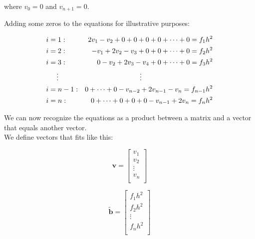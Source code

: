 where $v_0 = 0$ and $v_{n+1} = 0$.

Adding some zeros to the equations for illustrative purposes:

\begin{align*}
&i = 1:  &2v_1-v_2 + 0 + 0 + 0 +0 + \cdots + 0 = f_1 h^2\\
&i = 2: &-v_1+2v_2-v_3 +0 + 0 + \cdots + 0 = f_2 h^2\\
&i = 3:  &0 -v_2+2v_3-v_4 + 0 + \cdots + 0 = f_3 h^2\\
&\indent\vdots \indent &\vdots \indent \indent \hspace{2cm} \indent \\
&i = n-1: &0 + \cdots+ 0 -v_{n-2}+2v_{n-1} - v_n= f_{n-1} h^2\\
&i = n: &0 + \cdots + 0 + 0 + 0 -v_{n-1}+2v_n= f_n h^2\\
\end{align*}

We can now recognize the equations as a product between a matrix and a vector that equals another vector.\\

We define vectors that fits like this:
\begin{multicols}{3}
$$\textbf{v} = \begin{bmatrix}
	v_1\\
	v_2\\
	\vdots\\
	v_{n}\\
\end{bmatrix}$$

$$ \tilde{\textbf{b}} = \begin{bmatrix}
	f_1 h^2\\
	f_2 h^2\\
	\vdots\\
	f_{n} h^2\\
\end{bmatrix} $$
\end{multicols}

